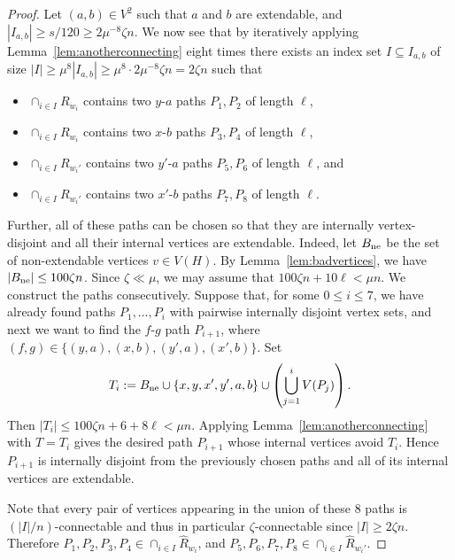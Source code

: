 \documentclass[A4paper,12pt]{article}
\theoremstyle{definition}
\begin{document}
\begin{proof}[Proof]
Let $(a,b)\in V^2$ such that $a$ and $b$ are extendable, and $|I_{a,b}|\geq s/120\geq 2\mu^{-8}\zeta n$.
We now see that by iteratively applying Lemma~\ref{lem:anotherconnecting} eight times there exists an index set
$I\subseteq I_{a,b}$ of size $|I|\geq \mu^{8} |I_{a,b}|\geq \mu^{8} \cdot 2 \mu^{-8}\zeta n=2\zeta n $ such that
\begin{itemize}
\item $\cap_{i\in I }R_{w_i}$ contains two $y$-$a$ paths $P_1,P_2$ of length $\ell$, 
\item $\cap_{i\in I }R_{w_i}$ contains two $x$-$b$ paths $P_3,P_4$ of length $\ell$, 
\item $\cap_{i\in I }R_{w_i'}$ contains two $y'$-$a$ paths $P_5,P_6$ of length $\ell$, and
\item $\cap_{i\in I }R_{w_i'}$ contains two $x'$-$b$ paths $P_7,P_8$ of length $\ell$. 
\end{itemize}
Further, all of these paths can be chosen so that they are internally
vertex-disjoint and all their internal vertices are extendable. Indeed, let
$B_{\rm ne}$ be the set of non-extendable vertices $v\in V(H)$. By Lemma~\ref{lem:badvertices}, we have
$|B_{\rm ne}|\leq 100\zeta n$.
Since $\zeta\ll \mu$, we may assume that $100\zeta n+10\ell<\mu n$. We construct the paths consecutively. Suppose that, for some
$0\leq i\leq 7$, we have already found paths
$P_1,\ldots,P_i$ with pairwise internally disjoint vertex sets, and
next we want to find the $f$-$g$ path $P_{i+1}$, where
$(f,g)\in \{(y,a),(x,b),(y',a),(x',b)\}$.
Set
\[
T_i :=
B_{\rm ne}
\cup \{x,y,x',y',a,b\}
\cup
\left(\bigcup_{j=1}^i V(P_j)\right).
\]
Then $|T_i|\leq 100\zeta n+6+8\ell<\mu n$. Applying Lemma~\ref{lem:anotherconnecting} with $T=T_i$ gives the
desired path $P_{i+1}$ whose internal vertices avoid $T_i$. Hence
$P_{i+1}$ is internally disjoint from the previously chosen paths and
all of its internal vertices are extendable.


Note that every pair of vertices appearing in the union of these 8 paths is $(|I|/n)$-connectable and thus in particular $\zeta $-connectable since $|I|\geq 2\zeta n$. Therefore  $P_1,P_2,P_3,P_4\in \cap_{i\in I }\hat{R}_{w_i}$, and $P_5,P_6,P_7,P_8\in \cap_{i\in I }\hat{R}_{w_i'}$. 



\end{proof}
\end{document}
